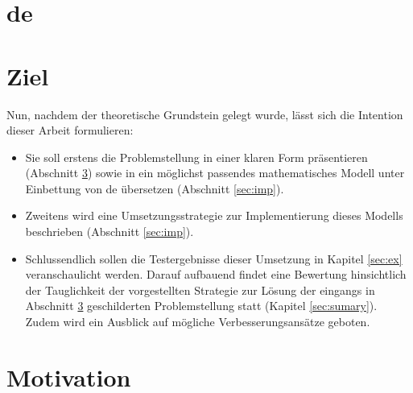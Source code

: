 		
		
	
	\section{\gls{de}}
	\label{sec:de}
	
	\section{Ziel}
	\label{sec:ziel}
	
		Nun, nachdem der theoretische Grundstein gelegt wurde, lässt sich die Intention dieser Arbeit formulieren:
		\begin{itemize}
			\item Sie soll erstens die Problemstellung in einer klaren Form präsentieren (Abschnitt \ref{sec:motivation}) sowie in ein möglichst passendes mathematisches Modell unter Einbettung von \gls{de} übersetzen (Abschnitt \ref{sec:imp}).
			\item Zweitens wird eine Umsetzungsstrategie zur Implementierung dieses Modells beschrieben (Abschnitt \ref{sec:imp}).
			\item Schlussendlich sollen die Testergebnisse dieser Umsetzung in Kapitel \ref{sec:ex} veranschaulicht werden. Darauf aufbauend findet eine Bewertung hinsichtlich der Tauglichkeit der vorgestellten Strategie zur Lösung der eingangs in Abschnitt \ref{sec:motivation} geschilderten Problemstellung statt (Kapitel \ref{sec:sumary}). Zudem wird ein Ausblick auf mögliche Verbesserungsansätze geboten. 
		\end{itemize}
	
	\section{Motivation}
	\label{sec:motivation}